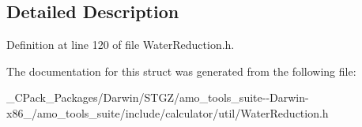 \subsection{Detailed Description}


Definition at line 120 of file Water\+Reduction.\+h.



The documentation for this struct was generated from the following file\+:\begin{DoxyCompactItemize}
\item 
\+\_\+\+C\+Pack\+\_\+\+Packages/\+Darwin/\+S\+T\+G\+Z/amo\+\_\+tools\+\_\+suite-\/-\/\+Darwin-\/x86\+\_/amo\+\_\+tools\+\_\+suite/include/calculator/util/Water\+Reduction.\+h\end{DoxyCompactItemize}
